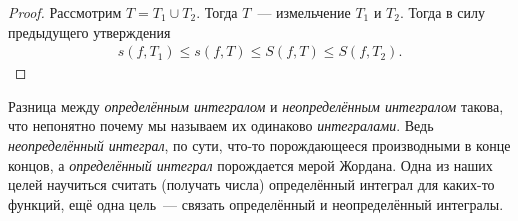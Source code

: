 \documentclass[../main.tex]{subfiles}
\begin{document}
\begin{proof}
    Рассмотрим $T = T_1 \cup T_2$. Тогда $T$~--- измельчение $T_1$ и $T_2$. Тогда в силу предыдущего утверждения
    \begin{gather*}
        s(f, T_1) \leq s(f, T) \leq S(f, T) \leq S(f, T_2).    
    \end{gather*}
\end{proof}

\begin{note}
    Разница между \emph{определённым интегралом} и \emph{неопределённым интегралом} такова, что непонятно почему мы называем их одинаково \emph{интегралами}. Ведь \emph{неопределённый интеграл}, по сути, что-то порождающееся производными в конце концов, а \emph{определённый интеграл} порождается мерой Жордана. Одна из наших целей научиться считать (получать числа) определённый интеграл для каких-то функций, ещё одна цель~--- связать определённый и неопределённый интегралы.
\end{note}
\end{document}
